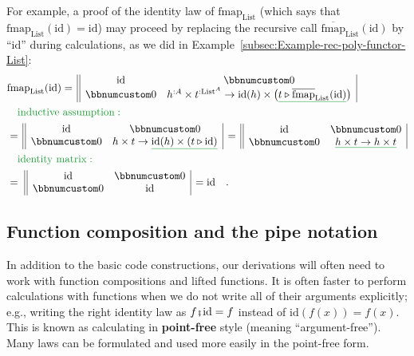For example, a proof of the identity law of $\text{fmap}_{\text{List}}$
(which says that $\text{fmap}_{\text{List}}(\text{id})=\text{id}$)
may proceed by replacing the recursive call $\overline{\text{fmap}}_{\text{List}}(\text{id})$
by \textsf{``}$\text{id}$\textsf{''} during calculations, as we did in Example~\ref{subsec:Example-rec-poly-functor-List}:
\begin{align*}
 & \text{fmap}_{\text{List}}(\text{id})=\,\begin{array}{||cc|}
\text{id} & \bbnum 0\\
\bbnum 0 & h^{:A}\times t^{:\text{List}^{A}}\rightarrow\text{id}(h)\times\big(\gunderline{t\triangleright\overline{\text{fmap}}_{\text{List}}(\text{id})}\big)
\end{array}\\
 & \quad{\color{greenunder}\text{inductive assumption}:}\quad\\
 & =\,\begin{array}{||cc|}
\text{id} & \bbnum 0\\
\bbnum 0 & h\times t\rightarrow\gunderline{\text{id}(h)\times(t\triangleright\text{id})}
\end{array}\,=\,\begin{array}{||cc|}
\text{id} & \bbnum 0\\
\bbnum 0 & \gunderline{h\times t\rightarrow h\times t}
\end{array}\\
 & \quad{\color{greenunder}\text{identity matrix}:}\quad\\
 & =\,\,\begin{array}{||cc|}
\text{id} & \bbnum 0\\
\bbnum 0 & \text{id}
\end{array}\,=\text{id}\quad.
\end{align*}


\subsection{Function composition and the pipe notation}

In addition to the basic code constructions, our derivations will
often need to work with function compositions and lifted functions.
It is often faster to perform calculations with functions when we
do not write all of their arguments explicitly; e.g., writing the
right identity law as $f\bef\text{id}=f$ instead of $\text{id}\left(f(x)\right)=f(x)$.
This is known as calculating in \textbf{point-free}
style (meaning \textsf{``}argument-free\textsf{''}). Many laws can be formulated and
used more easily in the point-free form. 

